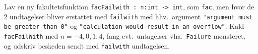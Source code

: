 Lav en ny fakultetsfunktion \lstinline{facFailwith : n:int -> int}, som \lstinline{fac}, men hvor de 2 undtagelser bliver erstattet med \lstinline{failwith} med hhv.\ argument \lstinline{"argument must be greater than 0"} og \lstinline{"calculation would result in an overflow"}. Kald \lstinline{facFailWith} med $n=-4,0,1,4$, fang evt.\ untagelser vha.\ \lstinline{Failure} mønsteret, og udskriv beskeden sendt med \lstinline{failwith} undtagelsen.
